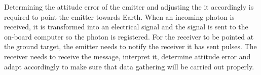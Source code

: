 Determining the attitude error of the emitter and adjusting the it accordingly is required to point the emitter towards Earth. When an incoming photon is received, it is transformed into an electrical signal and the signal is sent to the on-board computer so the photon is registered. For the receiver to be pointed at the ground target, the emitter needs to notify the receiver it has sent pulses. The receiver needs to receive the message, interpret it, determine attitude error and adapt accordingly to make sure that data gathering will be carried out properly. 

